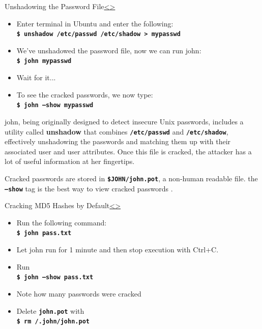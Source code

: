 \documentclass[12pt]{extarticle}
\newcommand{\code}[1]{\texttt{\bfseries#1}}
\newenvironment{instructionblock}{\Large\bgroup}{\egroup}
\begin{document}
\pagebreak
\begin{slide}{Unshadowing the Password File}{\hyperref[slide 8]{\textless}\hyperref[slide 10]{\textgreater}}
	\begin{instructionblock}
		\begin{itemize}
			\item Enter terminal in Ubuntu and enter the following:\\
				\code{\$ unshadow /etc/passwd /etc/shadow > mypasswd} 	
			\item We've unshadowed the password file, now we can run john:\\
				\code{\$ john mypasswd}
			\item{Wait for it...}
			\item{To see the cracked passwords, we now type:}\\
				\code{\$ john --show mypasswd}
		\end{itemize}
	\end{instructionblock}
\end{slide}
\vfill
john, being originally designed to detect insecure Unix passwords, includes a utility called \textbf{unshadow} that combines \code{/etc/passwd} and \code{/etc/shadow}, effectively unshadowing the passwords and matching them up with their associated user and user attributes. Once this file is cracked, the attacker has a lot of useful information at her fingertips. \cite{john}

Cracked passwords are stored in \code{\$JOHN/john.pot}, a non-human readable file. the \code{--show} tag is the best way to view cracked passwords \cite{john}.

\pagebreak
\begin{slide}{Cracking MD5 Hashes by Default}{\hyperref[slide 9]{\textless}\hyperref[slide 11]{\textgreater}}

	\begin{instructionblock}
	\begin{itemize}
		\item Run the following command:\\
			\code{\$ john pass.txt}
		\item Let john run for 1 minute and then stop execution with Ctrl+C.
		\item Run \\ \code{\$ john --show pass.txt}
		\item Note how many passwords were cracked
		\item Delete \code{john.pot} with\\
		\code{\$ rm \texttildelow/.john/john.pot}
	\end{itemize}
	\end{instructionblock}
\end{slide}
\vfill
\end{document}
